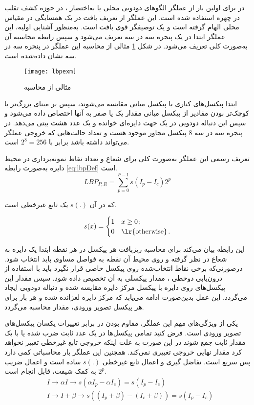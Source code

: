 در 
\cite{maatta2011face}
برای اولین بار از عملگر الگوهای دودویی محلی یا به‌اختصار ، در حوزه کشف تقلب در چهره استفاده شده است. این عملگر از تعریف بافت در یک همسایگی در مقیاس محلی الهام گرفته است و یک توصیفگر قوی بافت است. به‌منظور آشنایی اولیه، این عملگر ابتدا در یک پنجره سه در سه تعریف می‌شود و سپس رابطه محاسبه آن به‌صورت کلی تعریف می‌شود. در شکل 
\ref{fig:lbpexm}
مثالی از محاسبه این عملگر در پنجره سه در سه نشان داده‌شده است.

\begin{figure}[ht]
	\centerline{\texttt{[image: lbpexm]}}
	\caption{مثالی از محاسبه  \cite{maatta2011face}}
	\label{fig:lbpexm}
\end{figure}
ابتدا پیکسل‌های کناری با پیکسل میانی مقایسه می‌شوند، سپس بر مبنای بزرگ‌تر یا کوچک‌تر بودن مقادیر از پیکسل میانی مقدار یک یا صفر به آنها اختصاص داده می‌شود و سپس این دنباله دودویی در یک جهت دایره‌ای خوانده و یک عدد هشت بیتی می‌دهد. در پنجره سه در سه 8 پیکسل مجاور موجود هست و تعداد حالت‌هایی که خروجی عملگر می‌تواند داشته باشد برابر با
$2^8=256$
است.





تعریف رسمی این عملگر به‌صورت کلی برای شعاع  و تعداد نقاط نمونه‌برداری  در محیط دایره به‌صورت رابطه
\ref{eq:lbpDef}
است.
\begin{equation}\label{eq:lbpDef}
			LBP_{P,R}=\sum_{p=0}^{P-1}s(I_p-I_c)2^p 
\end{equation}

که در آن
$s(.)$
یک تابع غیر‌خطی است.

\[ s(x) = 
\begin{cases} 1  & \text{$x \geq 0 $}\,; \\
	0  & \text{\lr{otherwise}}\,.
\end{cases} \]


این رابطه بیان می‌کند برای محاسبه ریزبافت هر پیکسل در هر نقطه ابتدا یک دایره به شعاع  در نظر گرفته و روی محیط آن  نقطه به فواصل مساوی باید انتخاب شود. در‌صورتی‌که برخی نقاط انتخاب‌شده روی پیکسل خاصی قرار نگیرد باید با استفاده از درون‌یابی دو‌خطی
، مقدار پیکسلی به آن تخصیص داده شود. سپس مقدار این پیکسل‌های روی دایره با پیکسل مرکز دایره مقایسه شده و دنباله دودویی ایجاد می‌گردد. این عمل بدین‌صورت ادامه می‌یابد که مرکز دایره لغزانده شده و هر بار برای هر پیکسل تصویر ورودی، مقدار  محاسبه می‌گردد.

یکی از ویژگی‌های مهم این عملگر، مقاوم بودن در برابر تغییرات یکسان پیکسل‌های تصویر ورودی است. فرض کنید تمامی پیکسل‌ها در یک عدد ثابت ضرب شده یا با یک مقدار ثابت جمع شوند در این صورت به علت اینکه خروجی تابع غیرخطی تغییر نخواهد کرد مقدار نهایی خروجی  تغییری نمی‌کند.
همچنین این عملگر بار محاسباتی کمی دارد پس سریع است. تفاضل گیری و اعمال تابع غیر‌خطی   
$s(.)$
ساده است و اعمال ضریب
$2^p$
به کمک شیفت، قابل انجام است.
\begin{align}\label{eq:lbpfeature}
	&I \to \alpha I \to s(\alpha I_p -\alpha I_c) = s(I_p - I_c) \\
	&I \to I+\beta \to s((I_p + \beta)-(I_c + \beta)) = s(I_p - I_c ) 
\end{align}

